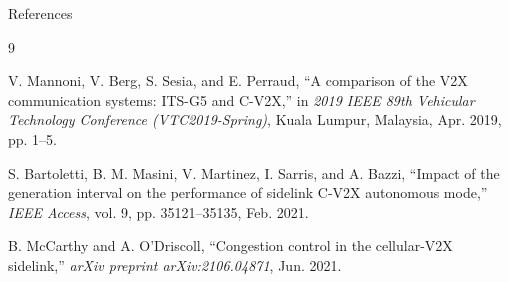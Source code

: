 \documentclass[aspectratio=1610]{beamer}
\begin{document}
\begin{frame}{References}
\footnotesize
\begin{thebibliography}{9}

V. Mannoni, V. Berg, S. Sesia, and E. Perraud,
``A comparison of the V2X communication systems: ITS-G5 and C-V2X,''
in \emph{2019 IEEE 89th Vehicular Technology Conference (VTC2019-Spring)},
Kuala Lumpur, Malaysia, Apr. 2019, pp. 1--5.

S. Bartoletti, B. M. Masini, V. Martinez, I. Sarris, and A. Bazzi,
``Impact of the generation interval on the performance of sidelink C-V2X autonomous mode,''
\emph{IEEE Access}, vol. 9, pp. 35121--35135, Feb. 2021.

B. McCarthy and A. O'Driscoll,
``Congestion control in the cellular-V2X sidelink,''
\emph{arXiv preprint arXiv:2106.04871}, Jun. 2021.
\end{thebibliography}
\end{frame}
\end{document}
